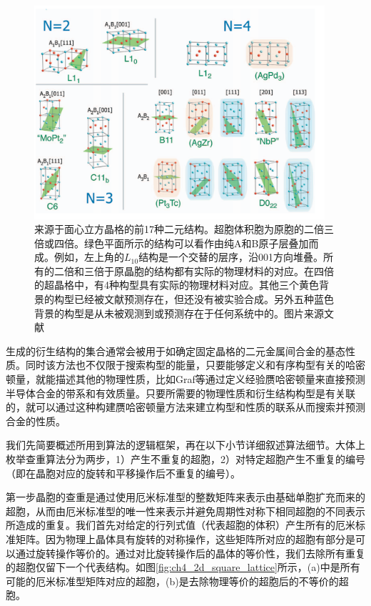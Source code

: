 \begin{figure}
  \includegraphics[width=0.96\textwidth]{figs/ch4_fcc_234_ss.png}
  \centering
  \caption{来源于面心立方晶格的前17种二元结构。超胞体积胞为原胞的二倍三倍或四倍。绿色平面所示的结构可以看作由纯A和B原子层叠加而成。例如，左上角的$L_{10}$结构是一个交替的层序，沿001方向堆叠。所有的二倍和三倍于原晶胞的结构都有实际的物理材料的对应。在四倍的超晶格中，有4种构型具有实际的物理材料对应。其他三个黄色背景的构型已经被文献\cite{curtarolo2005accuracy}预测存在，但还没有被实验合成。另外五种蓝色背景的构型是从未被观测到或预测存在于任何系统中的。图片来源文献\cite{hart2008algorithm}}
  \label{fig:ch4_fcc_234_ss}
\end{figure}

生成的衍生结构的集合通常会被用于如确定固定晶格的二元金属间合金的基态性质。同时该方法也不仅限于搜索构型的能量，只要能够定义和有序构型有关的哈密顿量，就能描述其他的物理性质，比如Graf等\cite{graf2005direct}通过定义经验赝哈密顿量来直接预测半导体合金的带系和有效质量。只要所需要的物理性质和衍生结构构型是有关联的，就可以通过这种构建赝哈密顿量方法来建立构型和性质的联系从而搜索并预测合金的性质。

我们先简要概述所用到算法的逻辑框架，再在以下小节详细叙述算法细节。大体上枚举查重算法分为两步，1）产生不重复的超胞，2）对特定超胞产生不重复的编号（即在晶胞对应的旋转和平移操作后不重复的编号）。

第一步晶胞的查重是通过使用厄米标准型的整数矩阵来表示由基础单胞扩充而来的超胞，从而由厄米标准型的唯一性来表示并避免周期性对称下相同超胞的不同表示所造成的重复。我们首先对给定的行列式值（代表超胞的体积）产生所有的厄米标准矩阵。因为物理上晶体具有旋转的对称操作，这些矩阵所对应的超胞有部分是可以通过旋转操作等价的。通过对比旋转操作后的晶体的等价性，我们去除所有重复的超胞仅留下一个代表结构。如图\ref{fig:ch4_2d_square_lattice}所示，(a)中是所有可能的厄米标准型矩阵对应的超胞，(b)是去除物理等价的超胞后的不等价的超胞。

